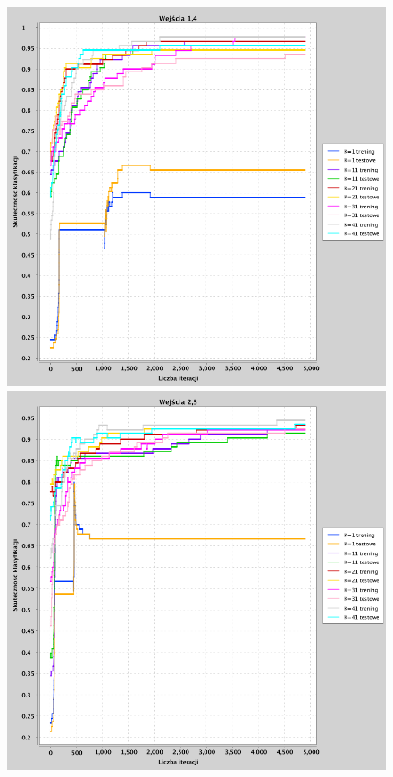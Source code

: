 \documentclass[a4paper, portrait,11pt]{article}
\begin{document}
\begin{figure}[!htb]
  \begin{minipage}{0.33\textwidth}
    \centering
    \includegraphics[width=1\linewidth]{../data/classification4/1/2_1,4.png}
    \caption{\label{fig:41_2_1,4}}
  \end{minipage}
  \begin{minipage}{0.33\textwidth}
    \centering
    \includegraphics[width=1\linewidth]{../data/classification4/1/2_2,3.png}

\end{minipage}
\end{figure}
\end{document}
